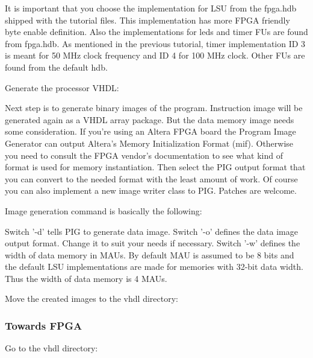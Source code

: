 \documentclass[twoside]{tceusermanual}
\begin{document}

It is important that you choose the implementation for LSU from the fpga.hdb
shipped with the tutorial files. This implementation has more FPGA friendly
byte enable definition. Also the implementations for leds and timer FUs are
found from fpga.hdb. As mentioned in the previous tutorial, timer
implementation ID 3 is meant for 50 MHz clock frequency and ID 4 for 100 MHz
clock. Other FUs are found from the default hdb.


Generate the processor VHDL:


Next step is to generate binary images of the program. Instruction image will
be generated again as a VHDL array package. But the data memory image needs
some consideration. If you're using an Altera FPGA board the Program Image
Generator can output Altera's Memory Initialization Format (mif).
Otherwise you need to consult the FPGA vendor's documentation to see what kind
of format is used for memory instantiation. Then select the PIG output format
that you can convert to the needed format with the least amount of work. Of
course you can also implement a new image writer class to PIG. Patches are
welcome.

Image generation command is basically the following:


Switch '-d' tells PIG to generate data image. Switch '-o' defines the data
image output format. Change it to suit your needs if necessary. Switch '-w'
defines the width of data memory in MAUs. By default MAU is assumed to be 8
bits and the default LSU implementations are made for memories with 32-bit
data width. Thus the width of data memory is 4 MAUs.

Move the created images to the vhdl directory:



\subsubsection{Towards FPGA}
Go to the vhdl directory:
\end{document}
